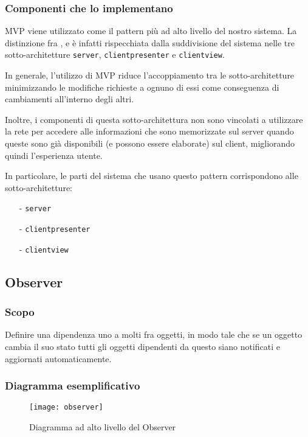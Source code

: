 \subsubsection{Componenti che lo implementano}
MVP viene utilizzato come il pattern più ad alto livello del nostro sistema. La distinzione fra ,  e  è infatti rispecchiata dalla suddivisione del sistema nelle tre sotto-architetture \texttt{server}, \texttt{clientpresenter} e \texttt{clientview}.

In generale, l'utilizzo di MVP riduce l'accoppiamento tra le sotto-architetture minimizzando le modifiche richieste a ognuno di essi come conseguenza di cambiamenti all'interno degli altri.

Inoltre, i componenti di questa sotto-architettura non sono vincolati a utilizzare la rete per accedere alle informazioni che sono memorizzate sul server quando queste sono già disponibili (e possono essere elaborate) sul client, migliorando quindi l'esperienza utente.

In particolare, le parti del sistema che usano questo pattern corrispondono alle sotto-architetture:
\begin{itemize}[noitemsep,nolistsep]
  \item[-] \texttt{server}
  \item[-] \texttt{clientpresenter}
  \item[-] \texttt{clientview}
\end{itemize}

\subsection{Observer}

\subsubsection{Scopo}
Definire una dipendenza uno a molti fra oggetti, in modo tale che se un oggetto cambia il suo stato tutti gli oggetti dipendenti da questo siano notificati e aggiornati automaticamente.

\subsubsection{Diagramma esemplificativo}
\begin{figure}[H]
\centering
\texttt{[image: observer]}
\caption{Diagramma ad alto livello del  Observer}\label{fig:observer}
\end{figure}

